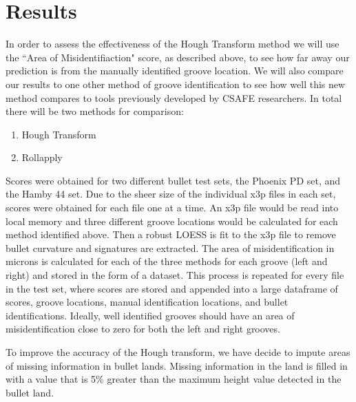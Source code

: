 \documentclass[12pt]{article}\usepackage[]{graphicx}\usepackage[]{color}
\theoremstyle{nonumberplain}
\begin{document}
\section{Results}

In order to assess the effectiveness of the Hough Transform method we will use the ``Area of Misidentifiaction" score, as described above, to see how far away our prediction is from the manually identified groove location. We will also compare our results to one other method of groove identification to see how well this new method compares to tools previously developed by CSAFE researchers. In total there will be two methods for comparison:

\begin{enumerate}
\item Hough Transform
\item Rollapply
\end{enumerate}

Scores were obtained for two different bullet test sets, the Phoenix PD set, and the Hamby 44 set. Due to the sheer size of the individual x3p files in each set, scores were obtained for each file one at a time. An x3p file would be read into local memory and three different groove locations would be calculated for each method identified above. Then a robust LOESS is fit to the x3p file to remove bullet curvature and signatures are extracted. The area of misidentification in microns is calculated for each of the three methods for each groove (left and right) and stored in the form of a dataset. This process is repeated for every file in the test set, where scores are stored and appended into a large dataframe of scores, groove locations, manual identification locations, and bullet identifications. Ideally, well identified grooves should have an area of misidentification close to zero for both the left and right grooves. 

To improve the accuracy of the Hough transform, we have decide to impute areas of missing information in bullet lands. Missing information in the land is filled in with a value that is 5\% greater than the maximum height value detected in the bullet land.
\end{document}
